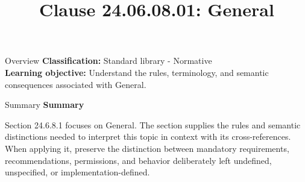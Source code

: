 \documentclass[10pt,letterpaper]{article}
\title{Clause 24.06.08.01: General}
\author{}
\date{}
\begin{document}
\maketitle
\begin{CornellOverviewBox}{Overview}
\textbf{Classification:} Standard library - Normative\\[2pt]
\textbf{Learning objective:} Understand the rules, terminology, and semantic consequences associated with General.
\end{CornellOverviewBox}\begin{CornellSummaryBox}{Summary}
{\sffamily\bfseries\color{Accent} Summary}\par\vspace{3pt}Section 24.6.8.1 focuses on General. The section supplies the rules and semantic distinctions needed to interpret this topic in context with its cross-references. When applying it, preserve the distinction between mandatory requirements, recommendations, permissions, and behavior deliberately left undefined, unspecified, or implementation-defined.
\end{CornellSummaryBox}
\end{document}

